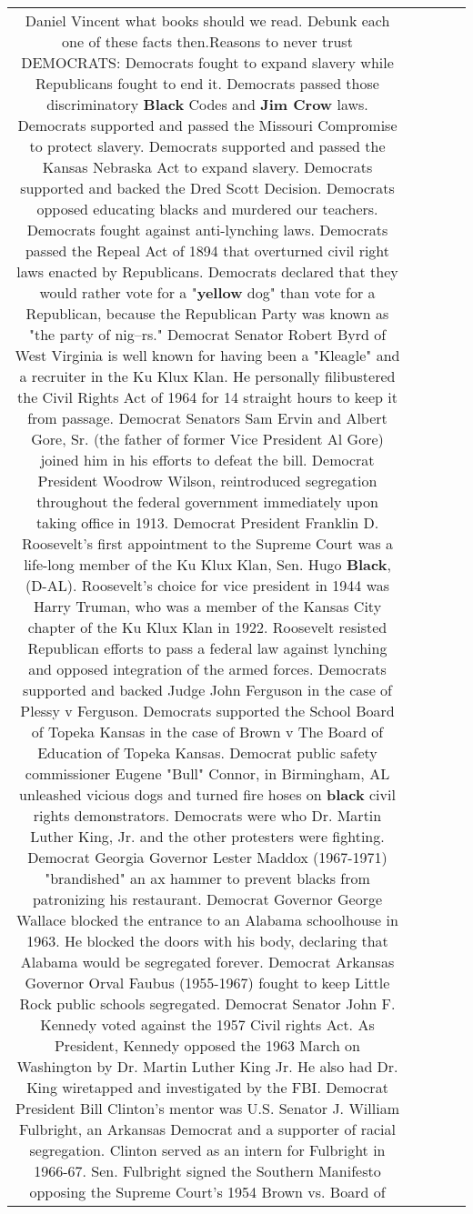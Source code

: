 \documentclass[11pt]{article}
\newlength\mylength
\begin{document}
\begin{center}
\begin{longtable}{|C{.65\mylength}|C{.30\mylength}|C{.12\mylength}|C{.12\mylength}|C{.12\mylength}|}
  \small Daniel Vincent what books should we read. Debunk each one of these facts then.Reasons to never trust DEMOCRATS: Democrats fought to expand slavery while Republicans fought to end it. Democrats passed those discriminatory \textbf{Black} Codes and \textbf{Jim C\textbf{row}} laws. Democrats supported and passed the Missouri Compromise to protect slavery. Democrats supported and passed the Kansas Nebraska Act to expand slavery. Democrats supported and backed the Dred Scott Decision. Democrats opposed educating blacks and murdered our teachers. Democrats fought against anti-lynching laws. Democrats passed the Repeal Act of 1894 that overturned civil right laws enacted by Republicans. Democrats declared that they would rather vote for a "\textbf{y\textbf{e\textbf{llow}}} dog" than vote for a Republican, because the Republican Party was known as "the party of nig--rs." Democrat Senator Robert Byrd of West Virginia is well known for having been a "Kleagle" and a recruiter in the Ku Klux Klan. He personally filibustered the Civil Rights Act of 1964 for 14 straight hours to keep it from passage. Democrat Senators Sam Ervin and Albert Gore, Sr. (the father of former Vice President Al Gore) joined him in his efforts to defeat the bill. Democrat President Woodrow Wilson, reintroduced segregation throughout the federal government immediately upon taking office in 1913. Democrat President Franklin D. Roosevelt's first appointment to the Supreme Court was a life-long member of the Ku Klux Klan, Sen. Hugo \textbf{Black}, (D-AL). Roosevelt's choice for vice president in 1944 was Harry Truman, who was a member of the Kansas City chapter of the Ku Klux Klan in 1922. Roosevelt resisted Republican efforts to pass a federal law against lynching and opposed integration of the armed forces. Democrats supported and backed Judge John Ferguson in the case of Plessy v Ferguson. Democrats supported the School Board of Topeka Kansas in the case of Brown v The Board of Education of Topeka Kansas. Democrat public safety commissioner Eugene "Bull" Connor, in Birmingham, AL unleashed vicious dogs and turned fire hoses on \textbf{black} civil rights demonstrators. Democrats were who Dr. Martin Luther King, Jr. and the other protesters were fighting. Democrat Georgia Governor Lester Maddox (1967-1971) "brandished" an ax hammer to prevent blacks from patronizing his restaurant. Democrat Governor George Wallace blocked the entrance to an Alabama schoolhouse in 1963. He blocked the doors with his body, declaring that Alabama would be segregated forever. Democrat Arkansas Governor Orval Faubus (1955-1967) fought to keep Little Rock public schools segregated. Democrat Senator John F. Kennedy voted against the 1957 Civil rights Act. As President, Kennedy opposed the 1963 March on Washington by Dr. Martin Luther King Jr. He also had Dr. King wiretapped and investigated by the FBI. Democrat President Bill Clinton's mentor was U.S. Senator J. William Fulbright, an Arkansas Democrat and a supporter of racial segregation. Clinton served as an intern for Fulbright in 1966-67. Sen. Fulbright signed the Southern Manifesto opposing the Supreme Court's 1954 Brown vs. Board of 
\end{longtable}
\end{center}
\end{document}

